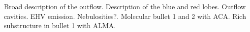 \documentclass[12pt]{mythesis}
\begin{document}
 Broad description of the outflow. Description of the blue and red lobes. Outflow cavities. EHV emission. Nebulosities?. Molecular bullet 1 and 2 with ACA. Rich substructure in bullet 1 with ALMA.

\end{document}
